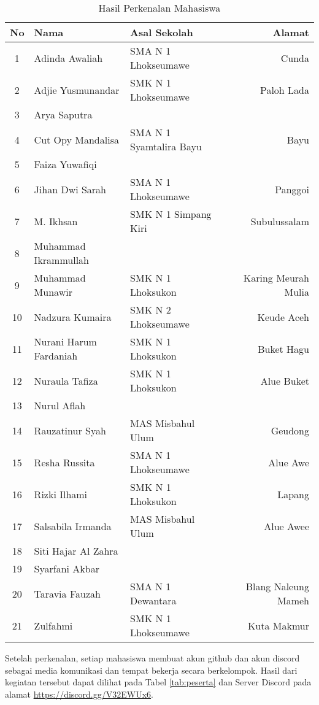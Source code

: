 \documentclass[a4paper]{tufte-handout}
\begin{document}
\begin{table}[!ht]
\vspace*{.5cm}
\caption{Hasil Perkenalan Mahasiswa}
\label{tab:perkenalan}
\centering
\begin{tabular}{cllr} 
\toprule
No & Nama 					& Asal Sekolah 			& Alamat\\
\midrule
1 & Adinda Awaliah			& SMA N 1 Lhokseumawe 	& Cunda \\
2 & Adjie Yusmunandar		& SMK N 1 Lhokseumawe 	& Paloh Lada \\
3 & Arya Saputra			& & \\
4 & Cut Opy Mandalisa		& SMA N 1 Syamtalira Bayu	& Bayu \\
5 & Faiza Yuwafiqi			& & \\
6 & Jihan Dwi Sarah			& SMA N 1 Lhokseumawe 	& Panggoi \\
7 & M. Ikhsan				& SMK N 1 Simpang Kiri 	& Subulussalam \\
\midrule
8 & Muhammad Ikrammullah	& & \\
9 & Muhammad Munawir		& SMK N 1 Lhoksukon		& Karing Meurah Mulia \\
10 & Nadzura Kumaira		& SMK N 2 Lhokseumawe 	& Keude Aceh \\
11 & Nurani Harum Fardaniah	& SMK N 1 Lhoksukon 	& Buket Hagu \\
12 & Nuraula Tafiza			& SMK N 1 Lhoksukon 	& Alue Buket \\
13 & Nurul Aflah			& & \\
14 & Rauzatinur Syah		& MAS Misbahul Ulum 	& Geudong \\
\midrule
15 & Resha Russita			& SMA N 1 Lhokseumawe 	& Alue Awe \\
16 & Rizki Ilhami			& SMK N 1 Lhoksukon 	& Lapang \\
17 & Salsabila Irmanda		& MAS Misbahul Ulum 	& Alue Awee \\
18 & Siti Hajar Al Zahra	& & \\
19 & Syarfani Akbar			& & \\
20 & Taravia Fauzah			& SMA N 1 Dewantara 	& Blang Naleung Mameh \\
21 & Zulfahmi				& SMK N 1 Lhokseumawe	& Kuta Makmur \\
\bottomrule
\end{tabular}
\end{table}

\vspace*{.5cm}
Setelah perkenalan, setiap mahasiswa membuat akun github dan akun discord sebagai media komunikasi dan tempat bekerja secara berkelompok. Hasil dari kegiatan tersebut dapat dilihat pada Tabel \ref{tab:peserta} dan Server Discord pada alamat \url{https://discord.gg/V32EWUx6}.
\end{document}
